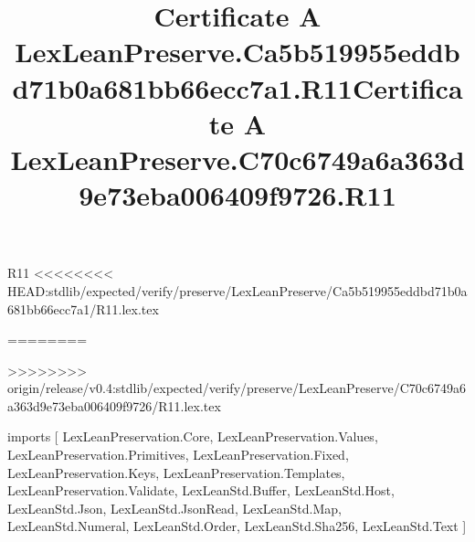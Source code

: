 \begin{lexlean}{R11}
<<<<<<<< HEAD:stdlib/expected/verify/preserve/LexLeanPreserve/Ca5b519955eddbd71b0a681bb66ecc7a1/R11.lex.tex
\title{Certificate A LexLeanPreserve.Ca5b519955eddbd71b0a681bb66ecc7a1.R11}
========
\title{Certificate A LexLeanPreserve.C70c6749a6a363d9e73eba006409f9726.R11}
>>>>>>>> origin/release/v0.4:stdlib/expected/verify/preserve/LexLeanPreserve/C70c6749a6a363d9e73eba006409f9726/R11.lex.tex
\begin{coremodule}
imports [
  LexLeanPreservation.Core,
  LexLeanPreservation.Values,
  LexLeanPreservation.Primitives,
  LexLeanPreservation.Fixed,
  LexLeanPreservation.Keys,
  LexLeanPreservation.Templates,
  LexLeanPreservation.Validate,
  LexLeanStd.Buffer,
  LexLeanStd.Host,
  LexLeanStd.Json,
  LexLeanStd.JsonRead,
  LexLeanStd.Map,
  LexLeanStd.Numeral,
  LexLeanStd.Order,
  LexLeanStd.Sha256,
  LexLeanStd.Text
]


\end{coremodule}
\end{lexlean}
